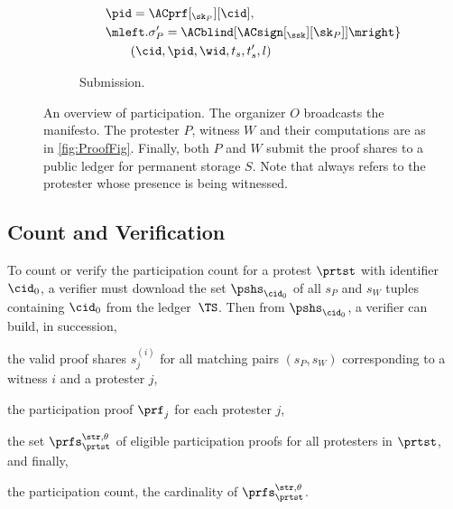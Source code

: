 \begin{figure*}
\begin{subfigure}{\columnwidth}
\begin{align*}
        & \qquad \pid = \ACprf[_{\sk_P}][\cid], \\
        & \qquad \mleft. \sigma_P' = \ACblind[\ACsign[_{\ssk}][\sk_P]] \mright\} 
        \\
        & \qquad\qquad (\cid, \pid, \wid, t_s, t_s', l)
    \end{align*}
    \caption{Submission.}
  \end{subfigure}
  \caption{%
    An overview of \CROCUS participation.\@
    The organizer \(O\) broadcasts the manifesto.
    The protester \(P\), witness \(W\) and their computations are as in \cref{fig:ProofFig}.
    Finally, both \(P\) and \(W\) submit the proof shares to a
   public ledger for permanent storage \(S\). Note that \pid  always refers to the
    protester whose presence is being witnessed.
  }%
  \label{fig:ProtocolOverview}
\end{figure*}


\subsection{Count and Verification}%
\label{ProtocolVerification}



To count or verify the participation count for a protest \(\prtst\) with 
identifier \(\cid_0\), a verifier must download the set \(\pshs_{\cid_0}\) of 
all \(s_P\) and \(s_W\) tuples containing \(\cid_0\) from the ledger~\(\TS\).
Then from \(\pshs_{\cid_0}\), a verifier can build, in succession,
\begin{enumerate*}
\item the valid proof shares \(s_j^{(i)}\) for all matching pairs \((s_P, 
    s_W)\) corresponding to a witness \(i\) and a protester \(j\),
\item the participation proof \(\prf_{j}\) for each protester \(j\),
\item the set \(\prfs_{\prtst}^{\str,\theta}\) of eligible participation proofs 
  for all protesters in \(\prtst\), and finally,
\item the participation count, \ie the cardinality of 
  \(\prfs_\prtst^{\str,\theta}\).
\end{enumerate*}

